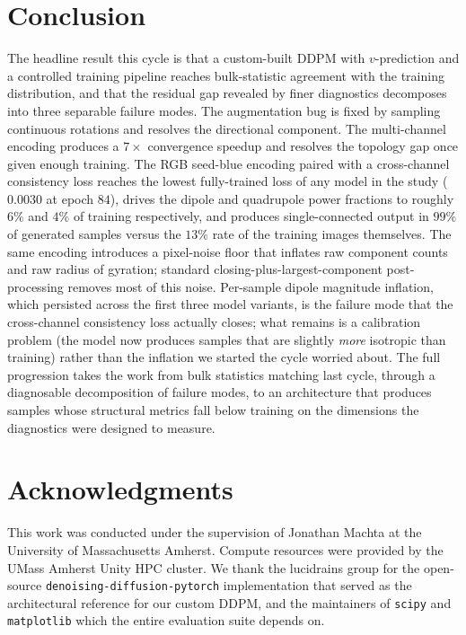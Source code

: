 \documentclass[11pt]{article}
\begin{document}
\section{Conclusion}

The headline result this cycle is that a custom-built DDPM with $v$-prediction and a controlled training pipeline reaches bulk-statistic agreement with the training distribution, and that the residual gap revealed by finer diagnostics decomposes into three separable failure modes. The augmentation bug is fixed by sampling continuous rotations and resolves the directional component. The multi-channel encoding produces a $7\times$ convergence speedup and resolves the topology gap once given enough training. The RGB seed-blue encoding paired with a cross-channel consistency loss reaches the lowest fully-trained loss of any model in the study ($0.0030$ at epoch $84$), drives the dipole and quadrupole power fractions to roughly $6\%$ and $4\%$ of training respectively, and produces single-connected output in $99\%$ of generated samples versus the $13\%$ rate of the training images themselves. The same encoding introduces a pixel-noise floor that inflates raw component counts and raw radius of gyration; standard closing-plus-largest-component post-processing removes most of this noise. Per-sample dipole magnitude inflation, which persisted across the first three model variants, is the failure mode that the cross-channel consistency loss actually closes; what remains is a calibration problem (the model now produces samples that are slightly \emph{more} isotropic than training) rather than the inflation we started the cycle worried about. The full progression takes the work from bulk statistics matching last cycle, through a diagnosable decomposition of failure modes, to an architecture that produces samples whose structural metrics fall below training on the dimensions the diagnostics were designed to measure.

\section*{Acknowledgments}

This work was conducted under the supervision of Jonathan Machta at the University of Massachusetts Amherst. Compute resources were provided by the UMass Amherst Unity HPC cluster. We thank the lucidrains group for the open-source \texttt{denoising-diffusion-pytorch} implementation that served as the architectural reference for our custom DDPM, and the maintainers of \texttt{scipy} and \texttt{matplotlib} which the entire evaluation suite depends on.
\end{document}
